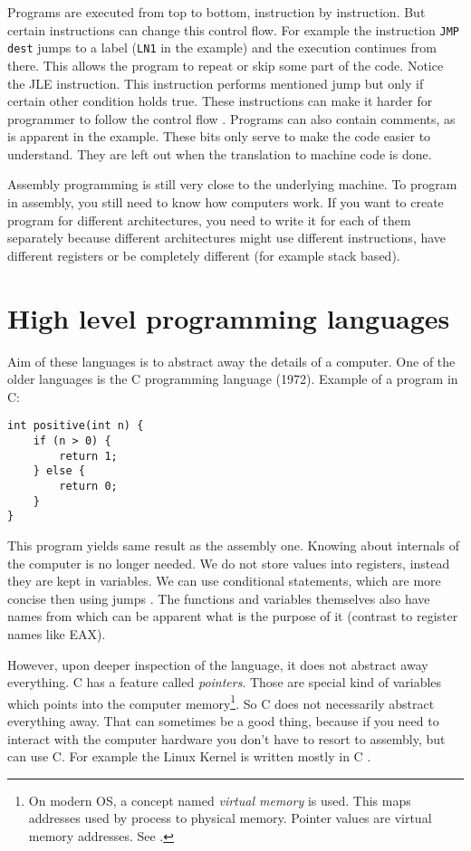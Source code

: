 Programs are executed from top to bottom, instruction by instruction. But certain instructions can change this control flow. For example the instruction \texttt{JMP dest}
jumps to a label (\texttt{LN1} in the example) and the execution continues from there. This allows the program to repeat or skip some part of the code.
Notice the JLE instruction. This instruction performs mentioned jump but only if certain other condition holds true.
These instructions can make it harder for programmer to follow the control flow .
Programs can also contain comments, as is apparent in the example. These bits only serve to make the code easier to understand.
They are left out when the translation to machine code is done.

Assembly programming is still very close to the underlying machine. To program in assembly, you still need to know
how computers work. If you want to create program for different architectures, you need to write it for each of them
separately because different architectures might use different instructions, have different registers or be completely 
different (for example stack based).

\section{High level programming languages}
Aim of these languages is to abstract away the details of a computer. One of the older languages is the C programming language (1972).
Example of a program in C:
\begin{verbatim}
int positive(int n) {
    if (n > 0) {
        return 1;
    } else {
        return 0;
    }
}
\end{verbatim}
This program yields same result as the assembly one. Knowing about internals of the computer is no longer needed.
We do not store values into registers, instead they are kept in variables. We can use conditional statements,
which are more concise then using jumps . 
The functions and variables themselves also have names from which
can be apparent what is the purpose of it (contrast to register names like EAX).

However, upon deeper inspection of the language, it does not abstract away everything. C has a feature called
\textit{pointers}. Those are special kind of variables which points into the computer memory\footnote{On modern OS,
a concept named \textit{virtual memory} is used. This maps addresses used by process to physical memory. Pointer values are virtual memory addresses. See \cite{modern-os}.}.
So C does not necessarily abstract everything away. That can sometimes be a good thing, because if you need to 
interact with the computer hardware you don't have to resort to assembly, but can use C. For example the Linux
 Kernel is written mostly in C \cite{linux-source}.

